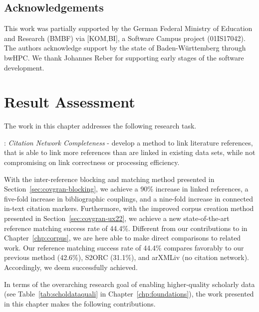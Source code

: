 \subsection*{Acknowledgements}
This work was partially supported by the German Federal Ministry of Education and Research (BMBF) via [KOM,BI], a Software Campus project (01IS17042).
The authors acknowledge support by the state of Baden-W{\"u}rttemberg through bwHPC.
We thank Johannes Reber for supporting early stages of the software development.

\section{Result Assessment}
\label{sec:covgran-assessment}

The work in this chapter addresses the following research task.

\begin{rtlist}
    \item[\rtmark{2}:] \textit{Citation Network Completeness} - develop a method to link literature references, that is able to link more references than are linked in existing data sets, while not compromising on link correctness or processing efficiency.
\end{rtlist}

With the inter-reference blocking and matching method presented in Section~\ref{sec:covgran-blocking}, we achieve a 90\% increase in linked references, a five-fold increase in bibliographic couplings, and a nine-fold increase in connected in-text citation markers.
Furthermore, with the improved corpus creation method presented in Section~\ref{sec:covgran-ux22}, we achieve a new state-of-the-art reference matching success rate of 44.4\%. Different from our contributions to  in Chapter~\ref{chp:corpus}, we are here able to make direct comparisons to related work. Our reference matching success rate of 44.4\% compares favorably to our previous method (42.6\%), S2ORC (31.1\%), and arXMLiv (no citation network). Accordingly, we deem  successfully achieved.

In terms of the overarching research goal of enabling higher-quality scholarly data (see Table~\ref{tab:scholdataquali} in Chapter~\ref{chp:foundations}), the work presented in this chapter makes the following contributions.

